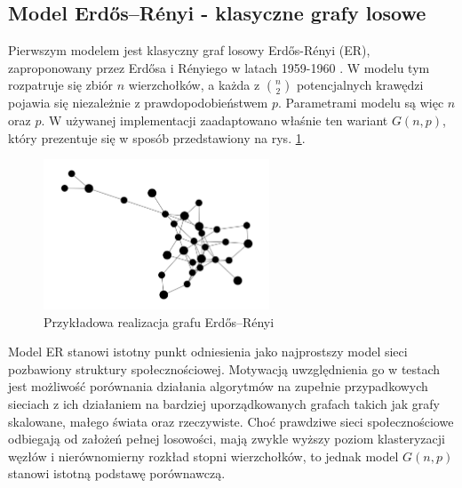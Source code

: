 \subsection{Model Erdős--Rényi - klasyczne grafy losowe}
Pierwszym modelem jest klasyczny graf losowy Erdős-Rényi (ER), zaproponowany przez Erdősa i Rényiego w latach 1959-1960 \cite{ErdosRenyi1960}. W modelu tym rozpatruje się zbiór $n$ wierzchołków, a każda z $\binom{n}{2}$ potencjalnych krawędzi pojawia się niezależnie z prawdopodobieństwem $p$. Parametrami modelu są więc $n$ oraz $p$. W używanej implementacji zaadaptowano właśnie ten wariant $G(n,p)$, który prezentuje się w sposób przedstawiony na rys. \ref{fig:ER}.

\begin{figure}[h]
  \centering
  \includegraphics[width=0.6\textwidth]{assets/test_data/random.png}
  \caption{Przykładowa realizacja grafu Erdős--Rényi}
  \label{fig:ER}
\end{figure}

Model ER stanowi istotny punkt odniesienia jako najprostszy model sieci pozbawiony struktury społecznościowej. Motywacją uwzględnienia go w testach jest możliwość porównania działania algorytmów na zupełnie przypadkowych sieciach z ich działaniem na bardziej uporządkowanych grafach takich jak grafy skalowane, małego świata oraz rzeczywiste. Choć prawdziwe sieci społecznościowe odbiegają od założeń pełnej losowości, mają zwykle wyższy poziom klasteryzacji węzłów i nierównomierny rozkład stopni wierzchołków, to jednak model $G(n, p)$ stanowi istotną podstawę porównawczą.


